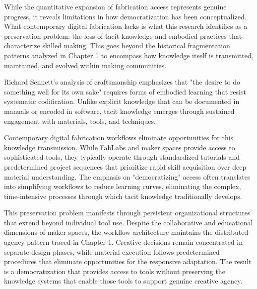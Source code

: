 While the quantitative expansion of fabrication access represents genuine progress, it reveals limitations in how democratization has been conceptualized. What contemporary digital fabrication lacks is what this research identifies as a preservation problem: the loss of tacit knowledge and embodied practices that characterize skilled making. This goes beyond the historical fragmentation patterns analyzed in Chapter 1 to encompass how knowledge itself is transmitted, maintained, and evolved within making communities.

\vspace{0.5cm}

Richard Sennett's analysis of craftsmanship emphasizes that "the desire to do something well for its own sake" \citep{sennet2009} requires forms of embodied learning that resist systematic codification. Unlike explicit knowledge that can be documented in manuals or encoded in software, tacit knowledge emerges through sustained engagement with materials, tools, and techniques.

\vspace{0.5cm}

Contemporary digital fabrication workflows eliminate opportunities for this knowledge transmission. While FabLabs and maker spaces provide access to sophisticated tools, they typically operate through standardized tutorials and predetermined project sequences that prioritize rapid skill acquisition over deep material understanding. The emphasis on "democratizing" access often translates into simplifying workflows to reduce learning curves, eliminating the complex, time-intensive processes through which tacit knowledge traditionally develops.

\vspace{0.5cm}

This preservation problem manifests through persistent organizational structures that extend beyond individual tool use. Despite the collaborative and educational dimensions of maker spaces, the workflow architecture maintains the distributed agency pattern traced in Chapter 1. Creative decisions remain concentrated in separate design phases, while material execution follows predetermined procedures that eliminate opportunities for the responsive adaptation. The result is a democratization that provides access to tools without preserving the knowledge systems that enable those tools to support genuine creative agency.

\vspace{0.5cm}

